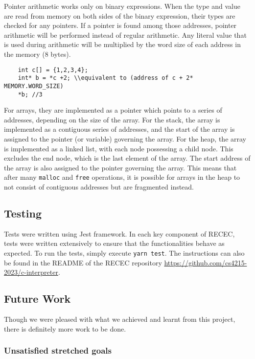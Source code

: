\documentclass[a4paper]{article}
\begin{document}
Pointer arithmetic works only on binary expressions. When the type and value are read from memory on both sides of the binary expression, their types are checked for any pointers. If a pointer is found among those addresses, pointer arithmetic will be performed instead of regular arithmetic. Any literal value that is used during arithmetic will be multiplied by the word size of each address in the memory (8 bytes). 

\begin{verbatim}
    int c[] = {1,2,3,4};
    int* b = *c +2; \\equivalent to (address of c + 2* MEMORY.WORD_SIZE)
    *b; //3
\end{verbatim}


For arrays, they are implemented as a pointer which points to a series of addresses, depending on the size of the array. For the stack, the array is implemented as a contiguous series of addresses, and the start of the array is assigned to the pointer (or variable) governing the array. For the heap, the array is implemented as a linked list, with each node possessing a child node. This excludes the end node, which is the last element of the array. The start address of the array is also assigned to the pointer governing the array. This means that after many \texttt{malloc} and \texttt{free} operations, it is possible for arrays in the heap to not consist of contiguous addresses but are fragmented instead.
\subsection{Testing}

Tests were written using Jest framework. In each key component of RECEC, tests were written extensively to ensure that the functionalities behave as expected. To run the tests, simply execute \texttt{yarn  test}. The instructions can also be found in the README of the RECEC repository \url{https://github.com/cs4215-2023/c-interpreter}.

\subsection{Future Work}

Though we were pleased with what we achieved and learnt from this project, there is definitely more work to be done. 

\subsubsection{Unsatisfied stretched goals}
\end{document}

